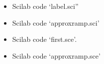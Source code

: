 \documentclass[12pt]{article}
\begin{document}
\begin{itemize}

\item Scilab code \textquoteleft label.sci\textquotedblright\\


\newpage
\item Scilab code \textquoteleft approx\textunderscore ramp.sci\textquoteright\\


\newpage
\item Scilab code \textquoteleft first.sce\textquoteright.\\
  

\newpage
\item  Scilab code \textquoteleft approx\textunderscore ramp.sce\textquoteright\\


\end{itemize}
\end{document}
